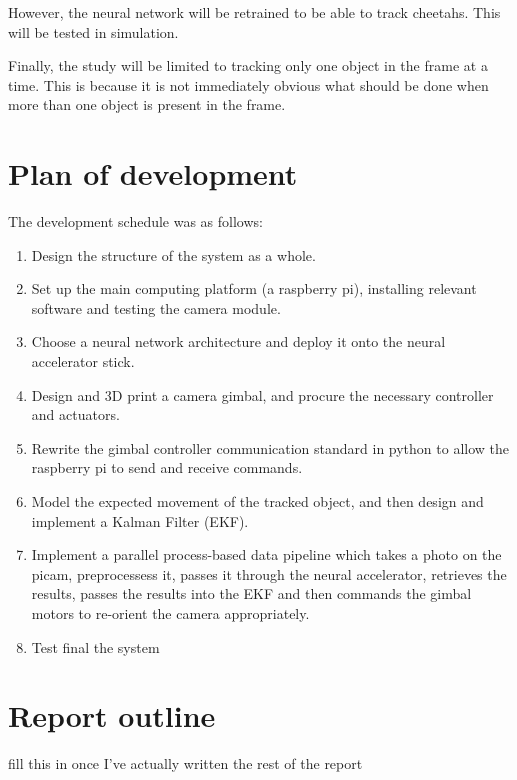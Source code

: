 However, the neural network will be retrained to be able to track cheetahs. This will be tested in simulation.

Finally, the study will be limited to tracking only one object in the frame at a time. This is because it is not immediately obvious what should be done when more than one object is present in the frame.


\section{Plan of development}
The development schedule was as follows:

\begin{enumerate}
\item Design the structure of the system as a whole.
\item Set up the main computing platform (a raspberry pi), installing relevant software and testing the camera module.
\item Choose a neural network architecture and deploy it onto the neural accelerator stick.
\item Design and 3D print a camera gimbal, and procure the necessary controller and actuators.
\item Rewrite the gimbal controller communication standard in python to allow the raspberry pi to send and receive commands.
\item Model the expected movement of the tracked object, and then design and implement a Kalman Filter (EKF).
\item Implement a parallel process-based data pipeline which takes a photo on the picam, preprocessess it, passes it through the neural accelerator, retrieves the results, passes the results into the EKF and then commands the gimbal motors to re-orient the camera appropriately.
\item Test final the system
\end{enumerate}

\section{Report outline}

{\Large \color{red} fill this in once I've actually written the rest of the report}
